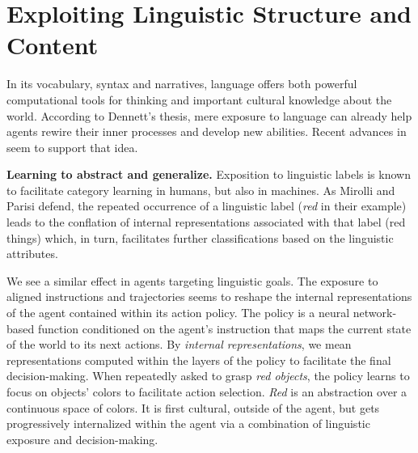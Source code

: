 \section{Exploiting Linguistic Structure and Content}
\label{sec:extraction}

In its vocabulary, syntax and narratives, language offers both powerful computational tools for thinking and important cultural knowledge about the world. According to Dennett's thesis, mere exposure to language can already help agents rewire their inner processes and develop new abilities. Recent advances in \ai seem to support that idea.

\textbf{Learning to abstract and generalize.} Exposition to linguistic labels is known to facilitate category learning in humans,\cite{waxman_words_1995, yoshida_sound_2003} but also in machines.\cite{lupyan_carving_2005} As Mirolli and Parisi defend, the repeated occurrence of a linguistic label (\textit{red} in their example) leads to the conflation of internal representations associated with that label (red things) which, in turn, facilitates further classifications based on the linguistic attributes.\cite{mirolli_towards_2011}

We see a similar effect in \rl agents targeting linguistic goals. The exposure to aligned instructions and trajectories seems to reshape the internal representations of the agent contained within its action policy. The policy is a neural network-based function conditioned on the agent's instruction that maps the current state of the world to its next actions. By \textit{internal representations}, we mean representations computed within the layers of the policy to facilitate the final decision-making. When repeatedly asked to grasp \textit{red objects}, the policy learns to focus on objects' colors to facilitate action selection.\cite{hill_emergent_2019,colas_language_2020} \textit{Red} is an abstraction over a continuous space of colors. It is first cultural, outside of the agent, but gets progressively internalized within the agent via a combination of linguistic exposure and decision-making. 

